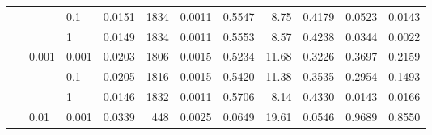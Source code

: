 \begin{table}[H]
{\begin{tabular}{cllrrrrrrrr}
	&  & 0.1 & {\cellcolor[HTML]{E1E1F4}} \color[HTML]{000000} 0.0151 & {\cellcolor[HTML]{0000FF}} \color[HTML]{F1F1F1} 1834 & {\cellcolor[HTML]{E4E4F3}} \color[HTML]{000000} 0.0011 & {\cellcolor[HTML]{0808FF}} \color[HTML]{F1F1F1} 0.5547 & {\cellcolor[HTML]{D1D1F4}} \color[HTML]{000000} 8.75 & {\cellcolor[HTML]{2E2EFD}} \color[HTML]{F1F1F1} 0.4179 & {\cellcolor[HTML]{E7E7F3}} \color[HTML]{000000} 0.0523 & {\cellcolor[HTML]{EEEEF3}} \color[HTML]{000000} 0.0143 \\
	&  & 1 & {\cellcolor[HTML]{E3E3F3}} \color[HTML]{000000} 0.0149 & {\cellcolor[HTML]{0000FF}} \color[HTML]{F1F1F1} 1834 & {\cellcolor[HTML]{E4E4F3}} \color[HTML]{000000} 0.0011 & {\cellcolor[HTML]{0707FF}} \color[HTML]{F1F1F1} 0.5553 & {\cellcolor[HTML]{D5D5F4}} \color[HTML]{000000} 8.57 & {\cellcolor[HTML]{2A2AFD}} \color[HTML]{F1F1F1} 0.4238 & {\cellcolor[HTML]{ECECF3}} \color[HTML]{000000} 0.0344 & {\cellcolor[HTML]{F0F0F3}} \color[HTML]{000000} 0.0022 \\
	&\multirow{3}{*}{0.001} & 0.001 & {\cellcolor[HTML]{B3B3F6}} \color[HTML]{000000} 0.0203 & {\cellcolor[HTML]{0505FF}} \color[HTML]{F1F1F1} 1806 & {\cellcolor[HTML]{B1B1F6}} \color[HTML]{000000} 0.0015 & {\cellcolor[HTML]{1616FE}} \color[HTML]{F1F1F1} 0.5234 & {\cellcolor[HTML]{9999F7}} \color[HTML]{F1F1F1} 11.68 & {\cellcolor[HTML]{6161FA}} \color[HTML]{F1F1F1} 0.3226 & {\cellcolor[HTML]{9797F7}} \color[HTML]{F1F1F1} 0.3697 & {\cellcolor[HTML]{B4B4F6}} \color[HTML]{000000} 0.2159 \\\
	& & 0.1 & {\cellcolor[HTML]{B1B1F6}} \color[HTML]{000000} 0.0205 & {\cellcolor[HTML]{0303FF}} \color[HTML]{F1F1F1} 1816 & {\cellcolor[HTML]{B1B1F6}} \color[HTML]{000000} 0.0015 & {\cellcolor[HTML]{0D0DFE}} \color[HTML]{F1F1F1} 0.5420 & {\cellcolor[HTML]{9E9EF7}} \color[HTML]{F1F1F1} 11.38 & {\cellcolor[HTML]{5050FB}} \color[HTML]{F1F1F1} 0.3535 & {\cellcolor[HTML]{AAAAF6}} \color[HTML]{000000} 0.2954 & {\cellcolor[HTML]{C7C7F5}} \color[HTML]{000000} 0.1493 \\
	& & 1 & {\cellcolor[HTML]{E6E6F3}} \color[HTML]{000000} 0.0146 & {\cellcolor[HTML]{0000FF}} \color[HTML]{F1F1F1} 1832 & {\cellcolor[HTML]{E4E4F3}} \color[HTML]{000000} 0.0011 & {\cellcolor[HTML]{0000FF}} \color[HTML]{F1F1F1} 0.5706 & {\cellcolor[HTML]{DDDDF4}} \color[HTML]{000000} 8.14 & {\cellcolor[HTML]{2626FD}} \color[HTML]{F1F1F1} 0.4330 & {\cellcolor[HTML]{F0F0F3}} \color[HTML]{000000} 0.0143 & {\cellcolor[HTML]{EDEDF3}} \color[HTML]{000000} 0.0166 \\
	&\multirow{3}{*}{0.01} & 0.001 & {\cellcolor[HTML]{3A3AFC}} \color[HTML]{F1F1F1} 0.0339 & {\cellcolor[HTML]{F0F0F3}} \color[HTML]{000000} 448 & {\cellcolor[HTML]{3232FC}} \color[HTML]{F1F1F1} 0.0025 & {\cellcolor[HTML]{F0F0F3}} \color[HTML]{000000} 0.0649 & {\cellcolor[HTML]{0000FF}} \color[HTML]{F1F1F1} 19.61 & {\cellcolor[HTML]{F0F0F3}} \color[HTML]{000000} 0.0546 & {\cellcolor[HTML]{0000FF}} \color[HTML]{F1F1F1} 0.9689 & {\cellcolor[HTML]{0000FF}} \color[HTML]{F1F1F1} 0.8550 \\

\end{tabular}}
\end{table}
